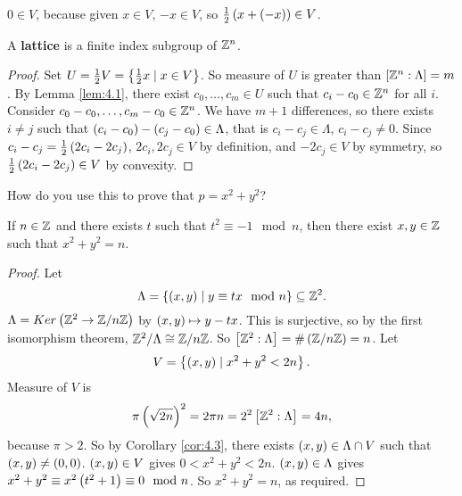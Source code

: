 \begin{remark}
$ 0 \in V $, because given $ x \in V $, $ -x \in V $, so $ \tfrac{1}{2}\left( x + \left( -x \right) \right) \in V $.
\end{remark}

A \textbf{lattice} is a finite index subgroup of $ \mathbb{Z}^n $.

\begin{proof}
Set $ U = \tfrac{1}{2}V = \left\{ \tfrac{1}{2}x \mid x \in V \right\} $. So measure of $ U $ is greater than $ \left[ \mathbb{Z}^n : \Lambda \right] = m $. By Lemma \ref{lem:4.1}, there exist $ c_0, \dots, c_m \in U $ such that $ c_i - c_0 \in \mathbb{Z}^n $ for all $ i $. Consider $ c_0 - c_0, \dots, c_m - c_0 \in \mathbb{Z}^n $. We have $ m + 1 $ differences, so there exists $ i \ne j $ such that $ \left( c_i - c_0 \right) - \left( c_j - c_0 \right) \in \Lambda $, that is $ c_i - c_j \in \Lambda $, $ c_i - c_j \ne 0 $. Since $ c_i - c_j = \tfrac{1}{2}\left( 2c_i - 2c_j \right) $, $ 2c_i, 2c_j \in V $ by definition, and $ -2c_j \in V $ by symmetry, so $ \tfrac{1}{2}\left( 2c_i - 2c_j \right) \in V $ by convexity.
\end{proof}

How do you use this to prove that $ p = x^2 + y^2 $?

\pagebreak


\begin{theorem}
If $ n \in \mathbb{Z} $ and there exists $ t $ such that $ t^2 \equiv -1 \mod n $, then there exist $ x, y \in \mathbb{Z} $ such that $ x^2 + y^2 = n $.
\end{theorem}

\begin{proof}
Let
$$ \Lambda = \left\{ \left( x, y \right) \mid y \equiv tx \mod n \right\} \subseteq \mathbb{Z}^2. $$
$ \Lambda = Ker\left( \mathbb{Z}^2 \to \mathbb{Z} / n\mathbb{Z} \right) $ by $ \left( x, y \right) \mapsto y - tx $. This is surjective, so by the first isomorphism theorem, $ \mathbb{Z}^2 / \Lambda \cong \mathbb{Z} / n\mathbb{Z} $. So $ \left[ \mathbb{Z}^2 : \Lambda \right] = \#\left( \mathbb{Z} / n\mathbb{Z} \right) = n $. Let
$$ V = \left\{ \left( x, y \right) \mid x^2 + y^2 < 2n \right\}. $$
Measure of $ V $ is
$$ \pi\left( \sqrt{2n} \right)^2 = 2\pi n = 2^2\left[ \mathbb{Z}^2 : \Lambda \right] = 4n, $$
because $ \pi > 2 $. So by Corollary \ref{cor:4.3}, there exists $ \left( x, y \right) \in \Lambda \cap V $ such that $ \left( x, y \right) \ne \left( 0, 0 \right) $. $ \left( x, y \right) \in V $ gives $ 0 < x^2 + y^2 < 2n $. $ \left( x, y \right) \in \Lambda $ gives $ x^2 + y^2 \equiv x^2\left( t^2 + 1 \right) \equiv 0 \mod n $. So $ x^2 + y^2 = n $, as required.
\end{proof}

